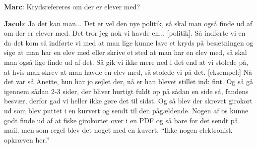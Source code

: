 \textbf{Marc}: Krydsrefereres om der er elever med? 

\textbf{Jacob}: Ja det kan man... Det er vel den nye politik, så skal man også finde ud af om der er elever med. Det tror jeg nok vi havde en... [politik]. Så indførte vi en da det kom så indførte vi med at man lige kunne lave et kryds på besætningen og sige at man har en elev med eller skrive et sted at man har en elev med, så skal man også lige finde ud af det. Så gik vi ikke mere ned i det end at vi stolede på, at hvis man skrev at man havde en elev med, så stolede vi på det. [eksempel:] Nå det var så Anette, hun har jo sejlet der, nå er han blevet stillet ind: fint. Og så gå igennem sådan 2-3 sider, der bliver hurtigt fuldt op på sådan en side så, fandens besvær, derfor gad vi heller ikke gøre det til sidst. 
Og så blev der skrevet girokort ud som blev puttet i en kurvert og sendt til den pågældende. Nogen af os kunne godt finde ud af at fiske girokortet over i en PDF og så bare for det sendt på mail, men som regel blev det noget med en kuvert. ``Ikke nogen elektronisk opkræven her.'' 

